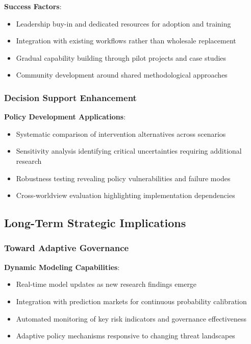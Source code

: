 \documentclass[
  11pt,
  letterpaper,
]{book}
\providecommand{\tightlist}{%
  \setlength{\itemsep}{0pt}\setlength{\parskip}{0pt}}
\begin{document}
\textbf{Success Factors}:

\begin{itemize}
\tightlist
\item
  Leadership buy-in and dedicated resources for adoption and training
\item
  Integration with existing workflows rather than wholesale replacement
\item
  Gradual capability building through pilot projects and case studies
\item
  Community development around shared methodological approaches
\end{itemize}

\subsubsection{Decision Support Enhancement}\label{sec-decision-support}

\textbf{Policy Development Applications}:

\begin{itemize}
\tightlist
\item
  Systematic comparison of intervention alternatives across scenarios
\item
  Sensitivity analysis identifying critical uncertainties requiring
  additional research
\item
  Robustness testing revealing policy vulnerabilities and failure modes
\item
  Cross-worldview evaluation highlighting implementation dependencies
\end{itemize}

\subsection{Long-Term Strategic
Implications}\label{sec-strategic-implications}

\subsubsection{Toward Adaptive
Governance}\label{sec-adaptive-governance}

\textbf{Dynamic Modeling Capabilities}:

\begin{itemize}
\tightlist
\item
  Real-time model updates as new research findings emerge
\item
  Integration with prediction markets for continuous probability
  calibration
\item
  Automated monitoring of key risk indicators and governance
  effectiveness
\item
  Adaptive policy mechanisms responsive to changing threat landscapes
\end{itemize}
\end{document}
